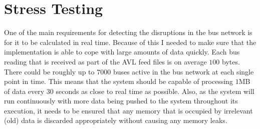 \section{Stress Testing}
One of the main requirements for detecting the disruptions in the bus network is for it to be calculated in real time. Because of this I needed to make sure that the implementation is able to cope with large amounts of data quickly. Each bus reading that is received as part of the AVL feed files is on average $100$ bytes. There could be roughly up to $7000$ buses active in the bus network at each single point in time. This means that the system should be capable of processing $1$MB of data every $30$ seconds as close to real time as possible. Also, as the system will run continuously with more data being pushed to the system throughout its execution, it needs to be ensured that any memory that is occupied by irrelevant (old) data is discarded appropriately without causing any memory leaks. 

